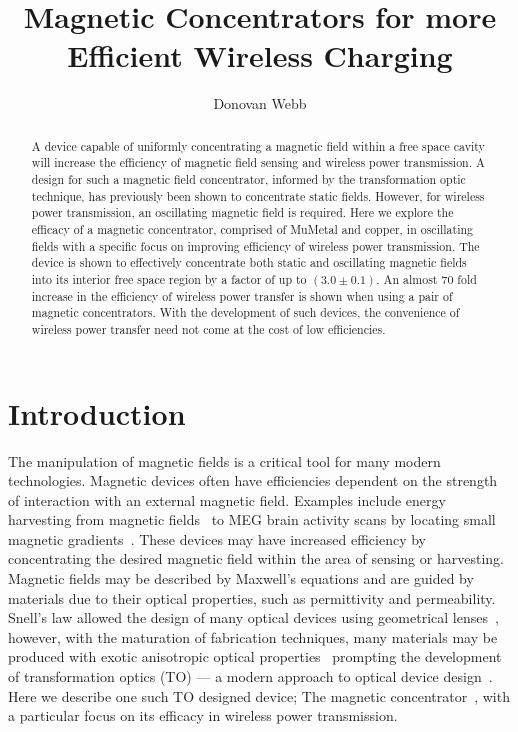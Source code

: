 \documentclass[11pt]{iopart}
\begin{document}
\title[]{Magnetic Concentrators for more Efficient Wireless Charging}

\author{Donovan Webb}

\address{Department of Physics,
University of Bath, Bath BA2 7AY, United Kingdom}

\begin{abstract}
A device capable of uniformly concentrating a magnetic field within a
free space cavity will increase the efficiency of magnetic field
sensing and wireless power transmission.
A design for such a magnetic field concentrator, informed by the
transformation optic technique, has previously been shown to
concentrate static fields.
However, for wireless power transmission, an oscillating magnetic
field is required.
Here we explore the efficacy of a magnetic concentrator, comprised of
MuMetal and copper, in oscillating fields with a specific focus on
improving efficiency of wireless power transmission.
The device is shown to effectively concentrate both static and
oscillating magnetic fields into its interior free space region by a
factor of up to $(3.0\pm0.1)$. An almost $70$ fold increase in the
efficiency of wireless power transfer is shown when using a pair of magnetic
concentrators.
With the development of such devices, the convenience of wireless
power transfer need not come at the cost of low efficiencies.

\end{abstract}
\section{Introduction}
The manipulation of magnetic fields is a critical tool for many modern
technologies. Magnetic devices often have efficiencies dependent on
the strength of interaction with an external magnetic field. Examples
include energy harvesting from magnetic fields~\cite{Hirai2000} to
MEG brain activity scans by locating small magnetic
gradients~\cite{Cohen1968}. These devices may have increased efficiency by
concentrating the desired magnetic field within the area of sensing or
harvesting. \\ Magnetic fields may be described by Maxwell's
equations and are guided by materials due to their
optical properties, such as permittivity and permeability. Snell's law
allowed the design of many optical devices
using geometrical lenses~\cite{Pendry2012}, however, with the maturation
of fabrication techniques, many materials may be produced with exotic
anisotropic optical properties~\cite{Smith2004} prompting the development
of transformation optics (TO) --- a modern approach to optical device
design~\cite{Pendry2006}.\\ Here we describe one such TO designed
device; The magnetic concentrator~\cite{Navau2012}, with a particular
focus on its efficacy in wireless power transmission. \\
\end{document}
